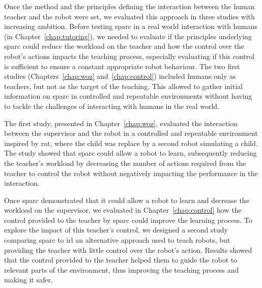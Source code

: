 Once the method and the principles defining the interaction between the human teacher and the robot were set, we evaluated this approach in three studies with increasing ambition. Before testing \gls{sparc} in a real world interaction with humans (in Chapter~\ref{chap:tutoring}), we needed to evaluate if the principles underlying \gls{sparc} could reduce the workload on the teacher and how the control over the robot's actions impacts the teaching process, especially evaluating if this control is sufficient to ensure a constant appropriate robot behaviour. The two first studies (Chapters~\ref{chap:woz} and~\ref{chap:control}) included humans only as teachers, but not as the target of the teaching. This allowed to gather initial information on \gls{sparc} in controlled and repeatable environments without having to tackle the challenges of interacting with humans in the real world.

The first study, presented in Chapter~\ref{chap:woz}, evaluated the interaction between the supervisor and the robot in a controlled and repeatable environment inspired by \gls{rat}, where the child was replace by a second robot simulating a child. The study showed that \gls{sparc} could allow a robot to learn, subsequently reducing the teacher's workload by decreasing the number of actions required from the teacher to control the robot without negatively impacting the performance in the interaction.

Once \gls{sparc} demonstrated that it could allow a robot to learn and decrease the workload on the supervisor, we evaluated in Chapter~\ref{chap:control} how the control provided to the teacher by \gls{sparc} could improve the learning process. To explore the impact of this teacher's control, we designed a second study comparing \gls{sparc} to \gls{irl} an alternative approach used to teach robots, but providing the teacher with little control over the robot's action. Results showed that the control provided to the teacher helped them to guide the robot to relevant parts of the environment, thus improving the teaching process and making it safer.

